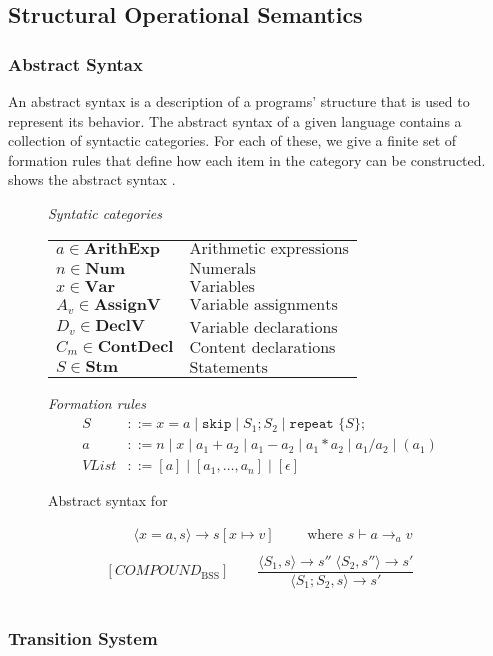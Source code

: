 \subsection{Structural Operational Semantics}

\subsubsection*{Abstract Syntax}
An abstract syntax is a description of a programs' structure that is used to represent its behavior. 
The abstract syntax of a given language contains a collection of syntactic categories. 
For each of these, we give a finite set of formation rules that define how each item in the category can be constructed.
 shows the abstract syntax \dazel{}.

\begin{figure}[htbp]
	\centering
	\textit{Syntatic categories}
	\vspace{4mm}


	\begin{tabular}{l l}
		$a \in \textbf{ArithExp}$ & $\text{Arithmetic expressions}$ \\ 
		$n \in \textbf{Num}$ & $\text{Numerals}$ \\
		$x \in \textbf{Var}$ & $\text{Variables}$ \\
		$A_v \in \textbf{AssignV}$ & $\text{Variable assignments}$ \\
		$D_v \in \textbf{DeclV}$ & $\text{Variable declarations}$ \\
		$C_m \in \textbf{ContDecl}$ & $\text{Content declarations}$ \\
		$S \in \textbf{Stm}$ & $\text{Statements}$
	\end{tabular}

	\vspace{4mm}
	\textit{Formation rules}
	\begin{align*}
		S&::=x=a\mid \texttt{skip}\mid S_1;S_2\mid \texttt{repeat }\{S\}; \\
		a&::=n\mid x\mid a_1+a_2\mid a_1-a_2\mid a_1*a_2\mid a_1/a_2\mid (a_1) \\
		VList&::=[a]\mid [a_1, \ldots, a_n]\mid [\epsilon]
	\end{align*}

	\caption{Abstract syntax for \dazel{}}
	\label{fig:AbstractSyntax}
\end{figure}

\begin{figure}[htbp]
	\centering
	\begin{gather*}
		[ASSIGNMENT_\text{BSS}] 
		\qquad \langle x=a,s\rangle \rightarrow s[x\mapsto v]
		\qquad \text{ where }s\vdash a \rightarrow_a v
		\\
		\\
		[COMPOUND_\text{BSS}] 
		\qquad \dfrac
		{\langle S_1, s\rangle \rightarrow s'' \;\langle S_2, s''\rangle \rightarrow s'}
		{\langle S_1;S_2,s\rangle\rightarrow s'}
		\\
		\\
	\end{gather*}
\end{figure}


\subsubsection*{Transition System}